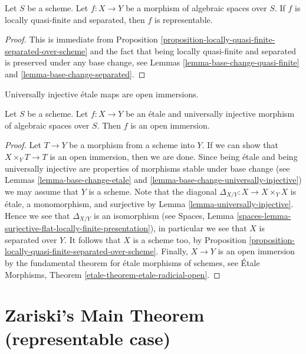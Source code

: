 \begin{lemma}
\label{lemma-locally-quasi-finite-separated-representable}
Let $S$ be a scheme. Let $f : X \to Y$ be a morphism of algebraic
spaces over $S$. If $f$ is locally quasi-finite and separated, then
$f$ is representable.
\end{lemma}

\begin{proof}
This is immediate from
Proposition \ref{proposition-locally-quasi-finite-separated-over-scheme}
and the fact that being locally quasi-finite and separated is
preserved under any base change, see
Lemmas \ref{lemma-base-change-quasi-finite} and
\ref{lemma-base-change-separated}.
\end{proof}

\begin{lemma}
\label{lemma-etale-universally-injective-open}
\begin{slogan}
Universally injective \'etale maps are open immersions.
\end{slogan}
Let $S$ be a scheme. Let $f : X \to Y$ be an \'etale and universally
injective morphism of algebraic spaces over $S$. Then $f$ is an open
immersion.
\end{lemma}

\begin{proof}
Let $T \to Y$ be a morphism from a scheme into $Y$.
If we can show that $X \times_Y T \to T$ is an open immersion, then we
are done. Since being \'etale and being universally injective are
properties of morphisms stable under base change (see
Lemmas \ref{lemma-base-change-etale} and
\ref{lemma-base-change-universally-injective})
we may assume that $Y$ is a scheme. Note that the
diagonal $\Delta_{X/Y} : X \to X \times_Y X$ is \'etale, a monomorphism, and
surjective by
Lemma \ref{lemma-universally-injective}.
Hence we see that $\Delta_{X/Y}$ is an isomorphism (see
Spaces, Lemma
\ref{spaces-lemma-surjective-flat-locally-finite-presentation}),
in particular we see that $X$ is separated over $Y$.
It follows that $X$ is a scheme too, by
Proposition \ref{proposition-locally-quasi-finite-separated-over-scheme}.
Finally, $X \to Y$ is an open immersion by the fundamental theorem
for \'etale morphisms of schemes, see
\'Etale Morphisms, Theorem \ref{etale-theorem-etale-radicial-open}.
\end{proof}



\section{Zariski's Main Theorem (representable case)}
\label{section-Zariski}

